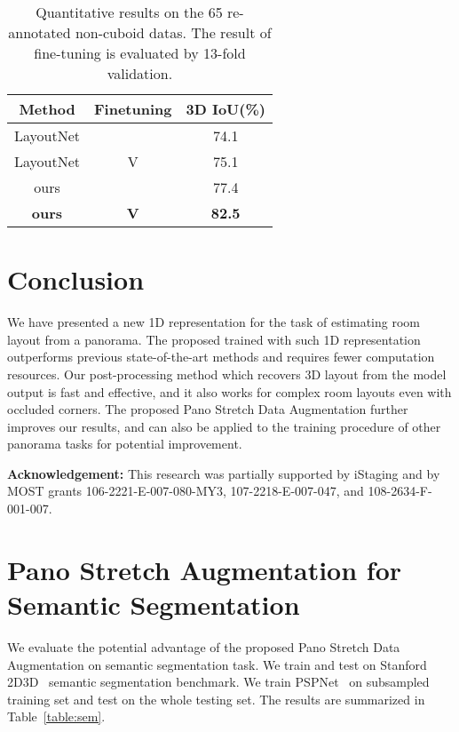 \documentclass[10pt,twocolumn,letterpaper]{article}
\begin{document}
\begin{table}[h]
    \centering
    \begin{tabular}{|c|c||c|} 
        \hline
        Method & Finetuning & 3D IoU(\%) \\
        \hline\hline
        
        LayoutNet &   & 74.1 \\
        \hline
        LayoutNet & V & 75.1 \\
        \hline
        ours      &   & 77.4 \\
        \hline
        \textbf{ours} & \textbf{V} & \textbf{82.5} \\
        \hline
        
    \end{tabular}

    \caption{
    Quantitative results on the 65 re-annotated non-cuboid datas. The result of fine-tuning is evaluated by 13-fold validation.
    }
    \label{table:quan_general}
\end{table}
 
\section{Conclusion}
We have presented a new 1D representation for the task of estimating room layout from a panorama. The proposed \modelname trained with such 1D representation outperforms previous state-of-the-art methods and requires fewer computation resources. Our post-processing method which recovers 3D layout from the model output is fast and effective, and it also works for complex room layouts even with occluded corners. The proposed Pano Stretch Data Augmentation further improves our results, and can also be applied to the training procedure of other panorama tasks for potential improvement. 
 
\vspace{2mm}
\noindent \textbf{Acknowledgement:} This research was partially supported by iStaging and by MOST grants 106-2221-E-007-080-MY3, 107-2218-E-007-047, and 108-2634-F-001-007. 
{\small


}

\newpage
\onecolumn
\setcounter{section}{0}
\renewcommand\thesection{\Alph{section}}
\section{Pano Stretch Augmentation for Semantic Segmentation}

We evaluate the potential advantage of the proposed Pano Stretch Data Augmentation on semantic segmentation task. We train and test on Stanford 2D3D~\cite{2017arXiv170201105A} semantic segmentation benchmark. We train PSPNet~\cite{zhao2017pyramid} on subsampled training set and test on the whole testing set. The results are summarized in Table~\ref{table:sem}.
\end{document}
